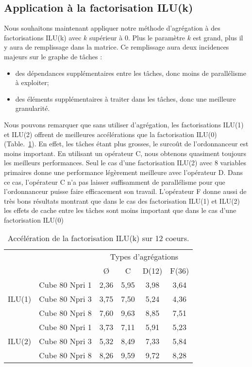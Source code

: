 \subsection{Application à la factorisation ILU(k)}
\label{sec:res_iluk}
Nous souhaitons maintenant appliquer notre méthode d'agrégation à des factorisations ILU(k) avec $k$ supérieur à 0.
%
Plus le paramètre $k$ est grand, plus il y aura de remplissage dans la matrice.
%
Ce remplissage aura deux incidences majeurs sur le graphe de tâches :
\begin{itemize}
  \item des dépendances supplémentaires entre les tâches, donc moins de parallélisme à exploiter;
  \item des éléments supplémentaires à traiter dans les tâches, donc une meilleure granularité.
\end{itemize}


Nous pouvons remarquer que sans utiliser d'agrégation, les factorisations ILU(1) et ILU(2) offrent de meilleures accélérations que la factorisation ILU(0) (Table.~\ref{tab:iluk_facto}).
%
En effet, les tâches étant plus grosses, le surcoût de l'ordonnanceur est moins important.
%
En utilisant un opérateur C, nous obtenons quasiment toujours les meilleurs performances.
%
Seul le cas d'une factorisation ILU(2) avec 8 variables primaires donne une performance légèrement meilleure avec l'opérateur D.
%
Dans ce cas, l'opérateur C n'a pas laisser suffisamment de parallélisme pour que l'ordonnanceur puisse faire efficacement son travail.
%
L'opérateur F donne aussi de très bons résultats montrant que dans le cas des factorisation ILU(1) et ILU(2) les effets de cache entre les tâches sont moins important que dans le cas d'une factorisation ILU(0)

\begin{table}[h!]
\begin{center}
  \begin{tabular}{|c|r|c|c|c|c|}
    \hline
       &   & \multicolumn{4}{|c|}{Types d'agrégations}\\
       &                & \O   &  C   & D(12) & F(36) \\
    \hline
       & Cube 80 Npri 1 & 2,36 & 5,95 & 3,98  & 3,64\\
ILU(1) & Cube 80 Npri 3 & 3,75 & 7,50 & 5,24  & 4,36\\
       & Cube 80 Npri 8 & 7,60 & 9,63 & 8,85  & 7,51\\
    \hline
       & Cube 80 Npri 1 & 3,73 & 7,11 & 5,91  & 5,23\\
ILU(2) & Cube 80 Npri 3 & 5,32 & 8,49 & 7,33  & 5,84\\
       & Cube 80 Npri 8 & 8,26 & 9,59 & 9,72  & 8,28\\
    \hline
  \end{tabular}
  \caption{Accélération de la factorisation ILU(k) sur 12 coeurs.}
  \label{tab:iluk_facto}
\end{center}
\end{table}
